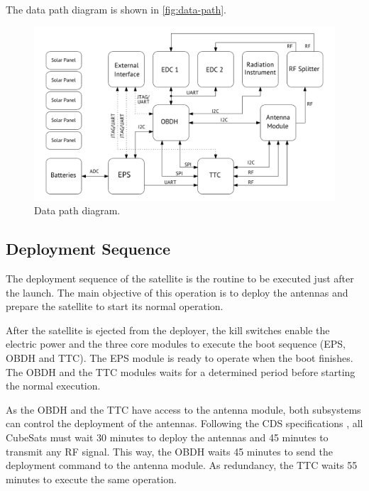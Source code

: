 The data path diagram is shown in \autoref{fig:data-path}.

\begin{figure}[!htb]
    \begin{center}
        \includegraphics[width=\textwidth]{figures/data_path_diagram.pdf}
        \caption{Data path diagram.}
        \label{fig:data-path}
    \end{center}
\end{figure}

\subsection{Deployment Sequence}

The deployment sequence of the satellite is the routine to be executed just after the launch. The main objective of this operation is to deploy the antennas and prepare the satellite to start its normal operation.

After the satellite is ejected from the deployer, the kill switches enable the electric power and the three core modules to execute the boot sequence (EPS, OBDH and TTC). The EPS module is ready to operate when the boot finishes. The OBDH and the TTC modules waits for a determined period before starting the normal execution.

As the OBDH and the TTC have access to the antenna module, both subsystems can control the deployment of the antennas. Following the CDS specifications \cite{cds}, all CubeSats must wait 30 minutes to deploy the antennas and 45 minutes to transmit any RF signal. This way, the OBDH waits 45 minutes to send the deployment command to the antenna module. As redundancy, the TTC waits 55 minutes to execute the same operation.

